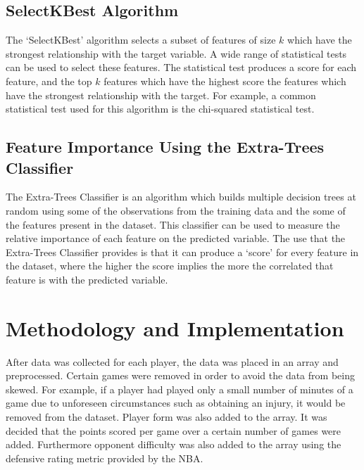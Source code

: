 \documentclass[a4paper,11pt,twoside]{article}
\begin{document}
\subsection{SelectKBest Algorithm}
The `SelectKBest' algorithm selects a subset of features of size $k$ which have the strongest relationship with the target variable. A wide range of statistical tests can be used to select these features. The statistical test produces a score for each feature, and the top $k$ features which have the highest score the features which have the strongest relationship with the target. For example, a common statistical test used for this algorithm is the chi-squared statistical test.  

 \subsection{Feature Importance Using the Extra-Trees Classifier}
 The Extra-Trees Classifier is an algorithm which builds multiple decision trees at random using some of the observations from the training data and the some of the features present in the dataset. This classifier can be used to measure the relative importance of each feature on the predicted variable. The use that the Extra-Trees Classifier provides is that it can produce a `score' for every feature in the dataset, where the higher the score implies the more the correlated that feature is with the predicted variable.



\newpage

\section{Methodology and Implementation}

After data was collected for each player, the data was placed in an array and preprocessed. Certain games were removed in order to avoid the data from being skewed. For example, if a player had played only a small number of minutes of a game due to unforeseen circumstances such as obtaining an injury, it would be removed from the dataset. Player form was also added to the array. It was decided that the points scored per game over a certain number of games were added. Furthermore opponent difficulty was also added to the array using the defensive rating metric provided by the NBA.
\end{document}
